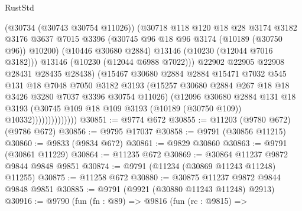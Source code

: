 \begin{lexlean}{RustStd}
\begin{coremodule}
                              (@30734 (@30743 @30754 @11026))
                              (@30718
                                @118
                                @120
                                @18
                                @28
                                @3174
                                @3182
                                @3176
                                @3637
                                @7015
                                @3396
                                (@30745 @96 @18 @96 @3174 (@10189 (@30750 @96)) @10200)
                                (@10446 @30680 @2884)
                                @13146
                                (@10230 (@12044 @7016 @3182)))
                              @13146
                              (@10230 (@12044 @6988 @7022)))
                            @22902
                            @22905
                            @22908
                            @28431
                            @28435
                            @28438)
                          (@15467
                            @30680
                            @2884
                            @2884
                            @15471
                            @7032
                            @545
                            @131
                            @18
                            @7048
                            @7050
                            @3182
                            @3193
                            (@15257 @30680 @2884 @267 @18 @18 @3426 @3280 @7037 @3396 @30754 @11026)
                            (@12096
                              @30680
                              @2884
                              @131
                              @18
                              @3193
                              (@30745
                                @109
                                @18
                                @109
                                @3193
                                (@10189 (@30750 @109))
                                @10332))))))))))))))
@30851 := @9774 @672
@30855 := @11203 (@9780 @672) (@9786 @672)
@30856 := @9795 @17037
@30858 := @9791 (@30856 @11215)
@30860 := @9833 (@9834 @672)
@30861 := @9829 @30860
@30863 := @9791 (@30861 @11229)
@30864 := @11235 @672
@30869 := @30864 @11237 @9872 @9844 @9848 @9851
@30874 := @9791 (@11234 (@30869 @11243 @11248) @11255)
@30875 := @11258 @672
@30880 := @30875 @11237 @9872 @9844 @9848 @9851
@30885 := @9791 (@9921 (@30880 @11243 @11248) @2913)
@30916 := @9790
    (fun (fn : @89) =>
    @9816
      (fun (rc : @9815) =>

\end{coremodule}
\end{lexlean}
